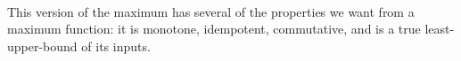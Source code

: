 \begin{code}%
%
\>[4]\AgdaSpace{}%
\AgdaSymbol{:}\AgdaSpace{}%
\AgdaSpace{}%
\AgdaSpace{}%
\AgdaSpace{}%
\AgdaSpace{}%
\<%
\\
%
\>[4]\AgdaSpace{}%
\AgdaSpace{}%
\AgdaSpace{}%
\AgdaSymbol{=}\AgdaSpace{}%
\AgdaSpace{}%
\AgdaSpace{}%
\AgdaSpace{}%
\AgdaSpace{}%
\AgdaSpace{}%
\AgdaSpace{}%
\AgdaSpace{}%
\<%
\end{code}

This version of the maximum has several of the properties we want from a
maximum function: it is monotone, idempotent,
commutative, and is a true least-upper-bound of its inputs.

